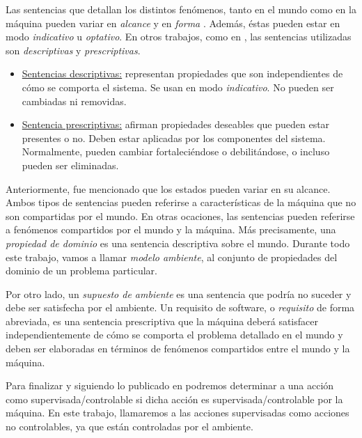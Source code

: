 Las sentencias que detallan los distintos fenómenos, tanto en el mundo como en la máquina pueden variar en
\emph{alcance} y en \emph{forma} \cite{Parnas95functionaldocuments,Jackson:1995:SRA:210207}. Además, éstas pueden estar en modo \emph{indicativo} u \emph{optativo}. En
otros trabajos, como en \cite{van2009requirements}, las sentencias utilizadas son \emph{descriptivas} y \emph{prescriptivas}.

\begin{itemize}
    \item \underline{Sentencias descriptivas:} representan propiedades que son independientes de cómo se comporta el
    sistema. Se usan en modo \emph{indicativo}. No pueden ser cambiadas ni removidas.
    \item \underline{Sentencia prescriptivas:} afirman propiedades deseables que pueden estar presentes o no. Deben estar
    aplicadas por los componentes del sistema. Normalmente, pueden cambiar fortaleciéndose o debilitándose, o incluso
    pueden ser eliminadas. 
\end{itemize}

Anteriormente, fue mencionado que los estados pueden variar en su alcance. Ambos tipos de sentencias pueden referirse a
características de la máquina que no son compartidas por el mundo. En otras ocaciones, las sentencias pueden referirse a
fenómenos compartidos por el mundo y la máquina. Más precisamente, una \emph{propiedad de dominio} es
una sentencia descriptiva sobre el mundo. Durante todo este trabajo, vamos a llamar \emph{modelo ambiente}, al conjunto
de propiedades del dominio de un problema particular.

Por otro lado, un \emph{supuesto de ambiente} es una sentencia que podría no suceder y debe ser satisfecha por el
ambiente. Un requisito de software, o \emph{requisito} de forma abreviada, es una sentencia prescriptiva que la máquina
deberá satisfacer independientemente de cómo se comporta el problema detallado en el mundo y deben ser elaboradas en
términos de fenómenos compartidos entre el mundo y la máquina.

Para finalizar y siguiendo lo publicado en \cite{VanLamsweerde:2001:GRE:882477.883624, 879820} podremos determinar a una
acción como supervisada/controlable si dicha acción es supervisada/controlable por la máquina. En este trabajo,
llamaremos a las acciones supervisadas como acciones no controlables, ya que están controladas por el ambiente.
